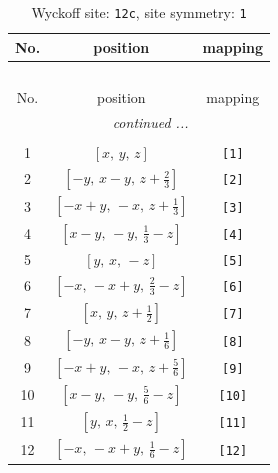\documentclass[fleqn,8pt]{jsarticle}
\begin{document}
\begin{longtable}{ccc}
\caption{Wyckoff site: {\tt 12c}, site symmetry: {\tt 1}}
 \\
 \hline \hline
No. & position & mapping \\ \hline \endfirsthead

\multicolumn{2}{l}{\tablename\ \thetable{}} \\
 \hline \hline
No. & position & mapping \\ \hline \endhead

 \hline \hline
\multicolumn{2}{r}{\footnotesize\it continued ...} \\ \endfoot

 \hline \hline
\multicolumn{2}{r}{} \\ \endlastfoot

1 & $\left[ x,\, y,\, z \right]$ & {\tt [1]} \\ \hline
2 & $\left[ - y,\, x - y,\, z + \frac{2}{3} \right]$ & {\tt [2]} \\ \hline
3 & $\left[ - x + y,\, - x,\, z + \frac{1}{3} \right]$ & {\tt [3]} \\ \hline
4 & $\left[ x - y,\, - y,\, \frac{1}{3} - z \right]$ & {\tt [4]} \\ \hline
5 & $\left[ y,\, x,\, - z \right]$ & {\tt [5]} \\ \hline
6 & $\left[ - x,\, - x + y,\, \frac{2}{3} - z \right]$ & {\tt [6]} \\ \hline
7 & $\left[ x,\, y,\, z + \frac{1}{2} \right]$ & {\tt [7]} \\ \hline
8 & $\left[ - y,\, x - y,\, z + \frac{1}{6} \right]$ & {\tt [8]} \\ \hline
9 & $\left[ - x + y,\, - x,\, z + \frac{5}{6} \right]$ & {\tt [9]} \\ \hline
10 & $\left[ x - y,\, - y,\, \frac{5}{6} - z \right]$ & {\tt [10]} \\ \hline
11 & $\left[ y,\, x,\, \frac{1}{2} - z \right]$ & {\tt [11]} \\ \hline
12 & $\left[ - x,\, - x + y,\, \frac{1}{6} - z \right]$ & {\tt [12]} \\
\end{longtable}
\end{document}
